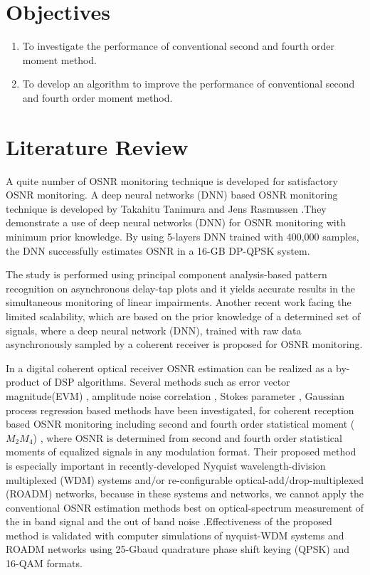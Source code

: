 \documentclass[12pt]{report}
\begin{document}
	\section{Objectives }
	\begin{enumerate}
		\item  To investigate the performance of conventional second and fourth order moment method.
		\item  To develop an algorithm to improve the performance of conventional second and fourth order moment method.
	\end{enumerate}
	\section{Literature Review} 
	A quite number of OSNR monitoring technique is developed for satisfactory OSNR monitoring. A deep neural networks (DNN) based OSNR monitoring technique is developed by Takahitu Tanimura and Jens Rasmussen \cite{deepOSNR}.They demonstrate a use of deep neural networks (DNN) for OSNR monitoring with minimum prior knowledge. By using 5-layers DNN trained with 400,000 samples, the DNN successfully estimates OSNR in a 16-GB DP-QPSK system. 
	
	The study is performed using principal component analysis-based pattern recognition on asynchronous delay-tap plots and it yields accurate results in the simultaneous monitoring of linear impairments. Another recent work facing the limited scalability, which are based on the prior knowledge of a determined set of signals, where a deep neural network (DNN), trained with raw data asynchronously sampled by a coherent receiver is proposed for OSNR monitoring.
	
	In a digital coherent optical receiver OSNR estimation can be realized as a by-product of DSP algorithms. Several methods such as error vector magnitude(EVM) \cite{errorVector}, amplitude noise correlation \cite{nonlin}, Stokes parameter \cite{densityDistributions}, Gaussian process regression \cite{Gaussian} based methods have been investigated, for coherent reception based OSNR monitoring including second and fourth order statistical moment ($M_2M_4$) \cite{inband,eqpsk}, where  OSNR is determined from second and fourth order statistical moments of equalized signals in any modulation format. Their proposed method is especially important in recently-developed Nyquist wavelength-division multiplexed (WDM) systems and$/$or re-configurable optical-add$/$drop-multiplexed (ROADM) networks, because in these systems and networks, we cannot apply the conventional OSNR estimation methods best on optical-spectrum measurement of the in band signal and the out of band noise .Effectiveness of the proposed method is validated with computer simulations of nyquist-WDM systems and ROADM networks using 25-Gbaud quadrature phase shift keying (QPSK) and 16-QAM formats.
	
\end{document}
